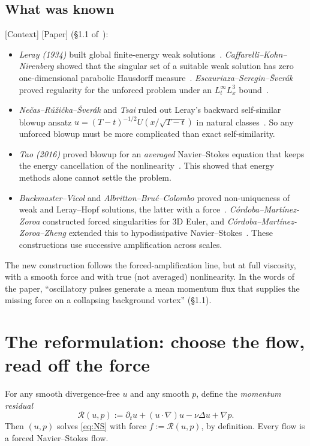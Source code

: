 \documentclass[11pt]{article}
\newcommand{\Res}{\mathcal{R}}
\theoremstyle{plain}
\theoremstyle{remark}
\newcommand{\paper}{\textsf{\small[Paper]}}
\newcommand{\ctx}{\textsf{\small[Context]}}
\begin{document}
\subsection{What was known}
\ctx{} \paper{} (\S1.1 of~\cite{OAI}):
\begin{itemize}[itemsep=1pt]
\item \emph{Leray (1934)} built global finite-energy weak solutions~\cite{Leray}. \emph{Caffarelli--Kohn--Nirenberg} showed that the singular set of a suitable weak solution has zero one-dimensional parabolic Hausdorff measure~\cite{CKN}. \emph{Escauriaza--Seregin--\v{S}ver\'ak} proved regularity for the unforced problem under an $L^\infty_tL^3_x$ bound~\cite{ESS}.
\item \emph{Ne\v{c}as--R\r{u}\v{z}i\v{c}ka--\v{S}ver\'ak} and \emph{Tsai} ruled out Leray's backward self-similar blowup ansatz $u=(T-t)^{-1/2}U(x/\sqrt{T-t})$ in natural classes~\cite{NRS,Tsai}. So any unforced blowup must be more complicated than exact self-similarity.
\item \emph{Tao (2016)} proved blowup for an \emph{averaged} Navier--Stokes equation that keeps the energy cancellation of the nonlinearity~\cite{Tao}. This showed that energy methods alone cannot settle the problem.
\item \emph{Buckmaster--Vicol} and \emph{Albritton--Brué--Colombo} proved non-uniqueness of weak and Leray--Hopf solutions, the latter with a force~\cite{BV,ABC}. \emph{Córdoba--Martínez-Zoroa} constructed forced singularities for 3D Euler, and \emph{Córdoba--Martínez-Zoroa--Zheng} extended this to hypodissipative Navier--Stokes~\cite{CMZ,CMZZ}. These constructions use successive amplification across scales.
\end{itemize}
The new construction follows the forced-amplification line, but at full viscosity, with a smooth force and with true (not averaged) nonlinearity. In the words of the paper, ``oscillatory pulses generate a mean momentum flux that supplies the missing force on a collapsing background vortex'' (\S1.1).

\section{The reformulation: choose the flow, read off the force}\label{sec:residual}

For any smooth divergence-free $u$ and any smooth $p$, define the \emph{momentum residual}
\begin{equation}\label{eq:residual}
\Res(u,p) := \partial_t u + (u\cdot\nabla)u - \nu\Delta u + \nabla p .
\end{equation}
Then $(u,p)$ solves \eqref{eq:NS} with force $f:=\Res(u,p)$, by definition. Every flow is a forced Navier--Stokes flow.
\end{document}
